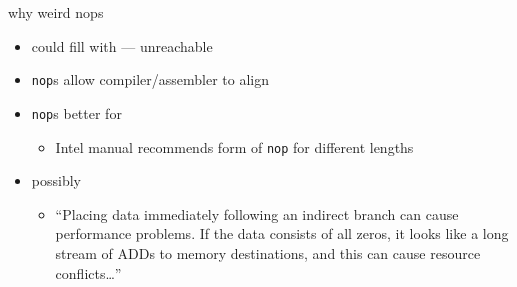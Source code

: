 \begin{frame}{why weird nops}
    \begin{itemize}
    \item could fill with  --- unreachable
    \item {\tt nop}s allow compiler/assembler to align 
    \item {\tt nop}s better for 
        \begin{itemize}
        \item Intel manual recommends form of {\tt nop} for different lengths
        \end{itemize}
    \item possibly 
        \begin{itemize}
        \item ``Placing data immediately following an indirect branch
              can cause performance problems. If the data consists of all zeros,
              it looks like a long stream of ADDs to memory destinations, and this can cause
              resource conflicts\ldots''
        \end{itemize}
    \end{itemize}
\end{frame}

